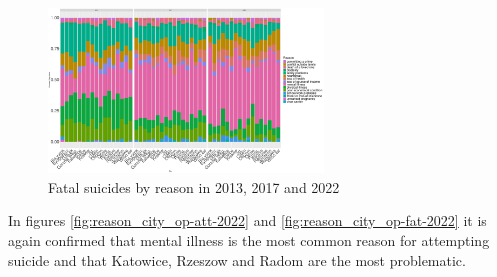 \documentclass{article}
\begin{document}
\begin{figure}[H]
    \centering
    \includegraphics[width=0.65\textwidth]{imgs/reason_city_fat_suicides-131722.pdf}
    \caption{Fatal suicides by reason  in 2013, 2017 and 2022}
    \label{fig:reason_city_fat_suicides-131722}
\end{figure}
In figures \ref{fig:reason_city_op-att-2022} and \ref{fig:reason_city_op-fat-2022}
it is again confirmed that mental illness is the most common reason for attempting
suicide and that Katowice, Rzeszow and Radom are the most problematic.
\end{document}
